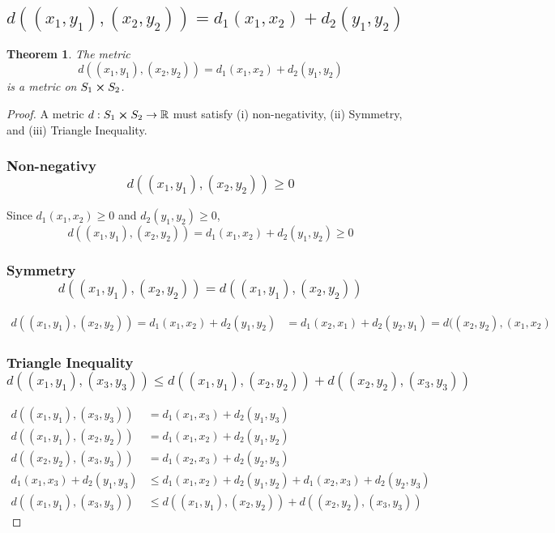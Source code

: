 \documentclass[]{article}
\newcommand{\R}{\mathbb{R}}
\newtheorem{theorem}{Theorem}
\begin{document}
\newpage
\subsection{$d((x_1,y_1),(x_2,y_2)) = d_1(x_1,x_2)  + d_2(y_1,y_2)$}

\begin{theorem}
    The metric $$d((x_1,y_1),(x_2,y_2)) = d_1(x_1,x_2)  + d_2(y_1,y_2)$$
    is a metric on $S_1 \cross S_2$.
\end{theorem}
\begin{proof}
    A metric $d: S_1 \cross S_2 \to \R$ must satisfy (i) non-negativity, 
    (ii) Symmetry, and (iii) Triangle Inequality.
    \subsubsection{Non-negativy $$d((x_1,y_1), (x_2,y_2)) \geq 0$$}
        Since $d_1(x_1,x_2) \geq 0$ and $d_2(y_1,y_2) \geq 0$,
        $$d((x_1,y_1), (x_2,y_2)) = d_1(x_1,x_2)  + d_2(y_1,y_2) \geq 0$$
    \subsubsection{Symmetry $$d((x_1,y_1),(x_2,y_2))=d((x_1,y_1),(x_2,y_2))$$}
    \begin{align*}
        d((x_1,y_1), (x_2,y_2)) = d_1(x_1,x_2)  + d_2(y_1,y_2) 
        &= d_1(x_2,x_1)  + d_2(y_2,y_1) = d((x_2,y_2),(x_1,x_2)
    \end{align*}
    \subsubsection{Triangle Inequality 
    $$d((x_1,y_1),(x_3,y_3)) \leq d((x_1,y_1),(x_2,y_2)) + d((x_2,y_2),(x_3,y_3))$$
    }
    \begin{align*}
        d((x_1,y_1),(x_3,y_3)) &= d_1(x_1,x_3)  + d_2(y_1,y_3)\\
        d((x_1,y_1),(x_2,y_2)) &= d_1(x_1,x_2)  + d_2(y_1,y_2)\\
        d((x_2,y_2),(x_3,y_3)) &= d_1(x_2,x_3)  + d_2(y_2,y_3)\\
        d_1(x_1,x_3)  + d_2(y_1,y_3)
            &\leq d_1(x_1,x_2)  + d_2(y_1,y_2)
            + d_1(x_2,x_3)  + d_2(y_2,y_3)\\
        d((x_1,y_1),(x_3,y_3)) &\leq d((x_1,y_1),(x_2,y_2)) + d((x_2,y_2),(x_3,y_3))
    \end{align*}
\end{proof}
\end{document}
